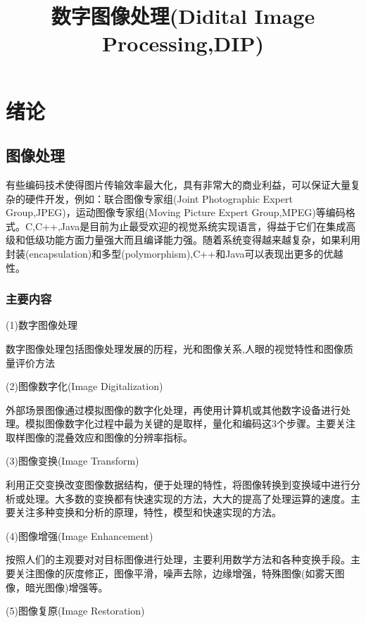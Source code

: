 \documentclass[11pt]{article}
\begin{document}
	\title{数字图像处理(Didital Image Processing,DIP)}
	
	\maketitle
	
	\newpage
	\tableofcontents
	\newpage
	
\section{绪论}
\subsection{图像处理}

有些编码技术使得图片传输效率最大化，具有非常大的商业利益，可以保证大量复杂的硬件开发，例如：联合图像专家组(Joint Photographic Expert Group,JPEG)，运动图像专家组(Moving Picture Expert Group,MPEG)等编码格式。C,C++,Java是目前为止最受欢迎的视觉系统实现语言，得益于它们在集成高级和低级功能方面力量强大而且编译能力强。随着系统变得越来越复杂，如果利用封装(encapsulation)和多型(polymorphism),C++和Java可以表现出更多的优越性。

\subsubsection{主要内容}

(1)数字图像处理

数字图像处理包括图像处理发展的历程，光和图像关系,人眼的视觉特性和图像质量评价方法

(2)图像数字化(Image Digitalization)

外部场景图像通过模拟图像的数字化处理，再使用计算机或其他数字设备进行处理。模拟图像数字化过程中最为关键的是取样，量化和编码这3个步骤。主要关注取样图像的混叠效应和图像的分辨率指标。

(3)图像变换(Image Transform)

利用正交变换改变图像数据结构，便于处理的特性，将图像转换到变换域中进行分析或处理。大多数的变换都有快速实现的方法，大大的提高了处理运算的速度。主要关注多种变换和分析的原理，特性，模型和快速实现的方法。

(4)图像增强(Image Enhancement)

按照人们的主观要对对目标图像进行处理，主要利用数学方法和各种变换手段。主要关注图像的灰度修正，图像平滑，噪声去除，边缘增强，特殊图像(如雾天图像，暗光图像)增强等。

(5)图像复原(Image Restoration)
\end{document}
